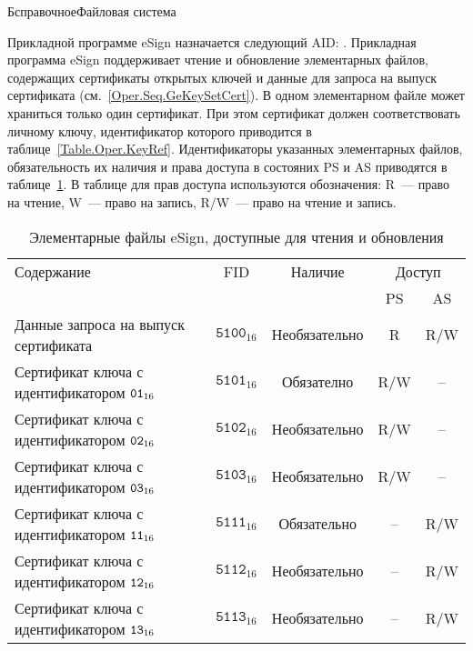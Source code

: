 \begin{appendix}{Б}{справочное}{Файловая система}

Прикладной программе eSign назначается следующий AID: 
. 
%
Прикладная программа eSign поддерживает чтение и обновление 
элементарных файлов, содержащих сертификаты открытых ключей и данные для
запроса на выпуск сертификата (см.~\ref{Oper.Seq.GeKeySetCert}). 
В одном элементарном файле может храниться только один
сертификат. При этом сертификат должен
соответствовать личному ключу, идентификатор которого приводится
в таблице~\ref{Table.Oper.KeyRef}.
Идентификаторы указанных элементарных файлов, обязательность
их наличия и права доступа в состояних PS и AS
приводятся в таблице~\ref{Table.FILES.EFSIGN}.
В таблице для прав доступа используются обозначения: 
R~--- право на чтение, W~--- право на запись,
R/W~--- право на чтение и запись.
 
\begin{table}[H]
\caption{Элементарные файлы eSign, доступные для чтения и обновления}
\label{Table.FILES.EFSIGN}
\begin{tabular}{|l|c|c|c|c|}
\hline
Содержание & FID & Наличие & \multicolumn{2}{|c|}{Доступ}\\
\cline{4-5}
& & & PS & AS \\
\hline
\hline
Данные запроса на выпуск сертификата & 
$\texttt{5100}_{16}$ & Необязательно &  R & R/W \\
Сертификат ключа с идентификатором $\texttt{01}_{16}$ & 
$\texttt{5101}_{16}$ & Обязателно & R/W & -- \\
Сертификат ключа с идентификатором $\texttt{02}_{16}$ & 
$\texttt{5102}_{16}$ & Необязательно & R/W & -- \\
Сертификат ключа с идентификатором $\texttt{03}_{16}$ & 
$\texttt{5103}_{16}$ & Необязательно & R/W & -- \\
Сертификат ключа с идентификатором $\texttt{11}_{16}$ & 
$\texttt{5111}_{16}$ & Обязательно & -- & R/W \\
Сертификат ключа с идентификатором $\texttt{12}_{16}$ & 
$\texttt{5112}_{16}$ & Необязательно &  -- & R/W \\
Сертификат ключа с идентификатором $\texttt{13}_{16}$ & 
$\texttt{5113}_{16}$ & Необязательно & -- & R/W \\
\hline
\end{tabular}
\end{table}

\mbox{}
\vfill
\mbox{}
\clearpage


\end{appendix}